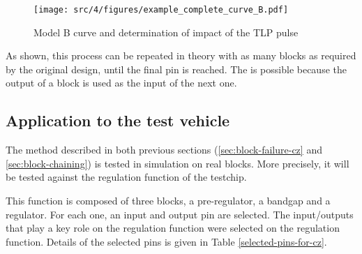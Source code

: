 \begin{figure}[!htbp]
  \centering
  \texttt{[image: src/4/figures/example\_complete\_curve\_B.pdf]}
  \caption{Model B curve and determination of impact of the TLP pulse}
  \label{example_complete_curve_B}
\end{figure}

As shown, this process can be repeated in theory with as many blocks as required by the original design, until the final pin is reached.
The is possible because the output of a block is used as the input of the next one.



\subsection{Application to the test vehicle}

The method described in both previous sections (\ref{sec:block-failure-cz} and \ref{sec:block-chaining}) is tested in simulation on real blocks.
More precisely, it will be tested against the regulation function of the testchip.

This function is composed of three blocks, a pre-regulator, a bandgap and a regulator.
For each one, an input and output pin are selected.
The input/outputs that play a key role on the regulation function were selected on the regulation function.
Details of the selected pins is given in Table \ref{selected-pins-for-cz}.

